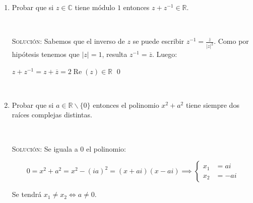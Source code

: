 \documentclass[12pt]{amsart}
\begin{document}
\begin{enumerate}

\item Probar que si $z \in \mathbb{C}$ tiene m\'odulo $1$ entonces $z + z^{-1} \in \mathbb{R}$.

\

\textsc{Solución:} Sabemos que el inverso de $z$ se puede escribir $z^{-1} = \frac{\overline{z} }{|z|^2}$. Como por hipótesis tenemos que $|z|=1$, resulta $z^{-1} = \overline{z}$. Luego:

$z + z^{-1} = z + \overline{z} = 2 \operatorname{Re} (z) \in \mathbb{R}$ \qed 

\

\item Probar que si $a\in \mathbb{R} \backslash \{0\} $ entonces el polinomio $x^2+a^2$ tiene siempre dos ra\'ices complejas distintas.

\

\textsc{Solución:} Se iguala a $0$ el polinomio:

\begin{equation*}
0 = x^2 + a^2 = x^2 - (ia)^2 = (x+ai)(x-ai) \implies \left\{ \begin{array}{rl}
x_1 &= ai \\
x_2 &= -ai
\end{array} \right.
\end{equation*}

Se tendrá $x_1 \neq x_2 \Leftrightarrow a \neq 0$.

\end{enumerate}
\end{document}
